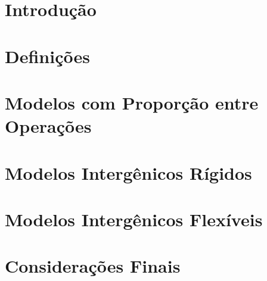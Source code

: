\documentclass[Portugues]{ic-tese-v3}
\theoremstyle{definition}
\theoremstyle{remark}
\theoremstyle{definition}
\begin{document}


\listoffigures

\listoftables





\tableofcontents


\fimdaspaginasiniciais


\chapter{Introdução}\label{chapter:XDSEJBWV}


\chapter{Definições}\label{chapter:CNDSVAJR}


\chapter{Modelos com Proporção entre Operações}\label{chapter:JWIGFELF}


\chapter{Modelos Intergênicos Rígidos}\label{chapter:DOVAEMLI}


\chapter{Modelos Intergênicos Flexíveis}\label{chapter:GMJBMTWF}


\chapter{Considerações Finais}\label{chapter:IXYEIWKC}








\end{document}
